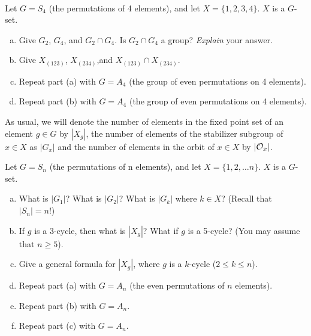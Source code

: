 
\begin{exercise}\label{exercise:actions:s4_gset_group}
\\
Let $G = S_4$ (the permutations of 4 elements), and let $X = \{1,2,3,4\}$.  $X$ is a $G$-set.
\begin{enumerate}[(a)]
\item
Give $G_2$, $G_4$, and $G_2 \cap G_4$.  Is $G_2 \cap G_4$ a group? \emph{Explain} your answer.
\item
Give $X_{(123)}$, $X_{(234)}$,and  $X_{(123)} \cap X_{(234)}$.
\item
Repeat part (a) with $G=A_4$ (the group of even permutations on 4 elements).
\item
Repeat part (b) with $G=A_4$ (the group of even permutations on 4 elements).
\end{enumerate}
\end{exercise} 
As usual, we will denote the number of elements in the fixed point set of an
element $g \in G$ by $|X_g|$, the number of elements of the stabilizer subgroup of $x\in X$ as $|G_x|$ and the number of elements in the orbit of $x \in X$ by $|{\cal O}_x|$.

\begin{exercise}\label{exercise:actions:sn_gset_group}
Let $G = S_n$ (the permutations of n elements), and let $X = \{1,2,\ldots n \}$.  $X$ is a $G$-set.
\begin{enumerate}[(a)]
\item
What is $|G_1|$? What is $|G_2|$? What is $|G_k|$ where $k \in X$?  (Recall that $|S_n| = n!$)
\item
If $g$ is a $3$-cycle, then what is $|X_g|$? What if $g$  is a 5-cycle?  (You may assume that $n \ge 5$).
\item
Give a general formula for $|X_g|$, where $g$ is a $k$-cycle ($2 \le k \le n$).
\item
Repeat part (a) with $G = A_n$ (the even permutations of $n$ elements).
\item
Repeat part (b) with $G = A_n$.
\item
Repeat part (c) with $G = A_n$.
\end{enumerate}
\end{exercise}

